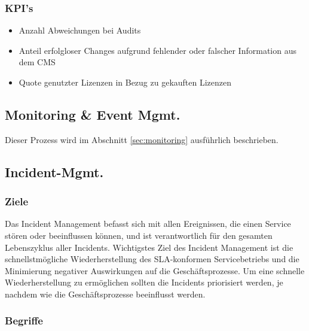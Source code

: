 \subsubsection{KPI's}

\begin{itemize}
	\item Anzahl Abweichungen bei Audits
	\item Anteil erfolgloser Changes aufgrund fehlender oder falscher Information aus dem CMS
	\item Quote genutzter Lizenzen in Bezug zu gekauften Lizenzen
\end{itemize}

\subsection{Monitoring \& Event Mgmt.}

Dieser Prozess wird im Abschnitt \ref{sec:monitoring} ausführlich beschrieben.

\subsection{Incident-Mgmt.}

\subsubsection{Ziele}

Das Incident Management befasst sich mit allen Ereignissen, die einen Service stören oder beeinflussen können, und ist verantwortlich für den gesamten Lebenszyklus aller Incidents. Wichtigstes Ziel des Incident Management ist die schnellstmögliche Wiederherstellung des SLA-konformen Servicebetriebs und die Minimierung negativer Auswirkungen auf die Geschäftsprozesse. Um eine schnelle Wiederherstellung zu ermöglichen sollten die Incidents priorisiert werden, je nachdem wie die Geschäftsprozesse beeinflusst werden.

\subsubsection{Begriffe}

